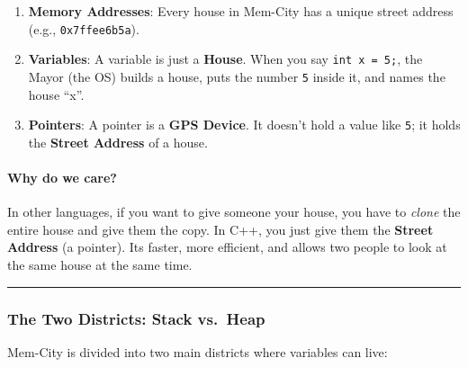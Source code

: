 \begin{enumerate}
\def\labelenumi{\arabic{enumi}.}
\tightlist
\item
  \textbf{Memory Addresses}: Every house in Mem-City has a unique street
  address (e.g., \passthrough{\lstinline!0x7ffee6b5a!}).
\item
  \textbf{Variables}: A variable is just a \textbf{House}. When you say
  \passthrough{\lstinline!int x = 5;!}, the Mayor (the OS) builds a
  house, puts the number \passthrough{\lstinline!5!} inside it, and
  names the house ``x''.
\item
  \textbf{Pointers}: A pointer is a \textbf{GPS Device}. It doesn't hold
  a value like \passthrough{\lstinline!5!}; it holds the \textbf{Street
  Address} of a house.
\end{enumerate}

\hypertarget{why-do-we-care}{%
\paragraph{Why do we care?}\label{why-do-we-care}}

In other languages, if you want to give someone your house, you have to
\emph{clone} the entire house and give them the copy. In C++, you just
give them the \textbf{Street Address} (a pointer). Its faster, more
efficient, and allows two people to look at the same house at the same
time.

\begin{center}\rule{0.5\linewidth}{0.5pt}\end{center}

\hypertarget{the-two-districts-stack-vs.-heap}{%
\subsubsection{The Two Districts: Stack
vs.~Heap}\label{the-two-districts-stack-vs.-heap}}

Mem-City is divided into two main districts where variables can live:


